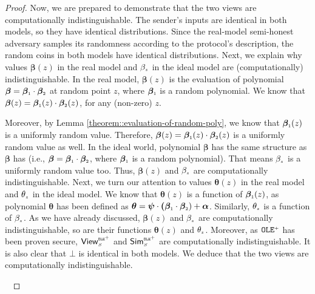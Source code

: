 \begin{proof}
Now, we are prepared to demonstrate that the two views are computationally indistinguishable. The sender's inputs are identical in both models, so they have identical distributions. Since the real-model semi-honest adversary samples its randomness according to the protocol's description, the random coins in both models have identical distributions.  Next, we explain why values $\bm\beta(z)$ in the real model and $\beta_{\scriptscriptstyle z}$ in the ideal model are (computationally) indistinguishable. In the real model, $\bm\beta(z)$ is the evaluation of polynomial $\bm\beta=\bm\beta_{\scriptscriptstyle 1}\cdot \bm\beta_{\scriptscriptstyle 2}$ at random point $z$, where $\bm\beta_{\scriptscriptstyle 1}$ is a random polynomial. We know that $\bm\beta(z)=\bm\beta_{\scriptscriptstyle 1}(z)\cdot \bm\beta_{\scriptscriptstyle 2}(z)$, for any (non-zero) $z$.  

Moreover, by Lemma \ref{theorem::evaluation-of-random-poly}, we know that $\bm\beta_{\scriptscriptstyle 1}(z)$ is a uniformly random value. Therefore, $\bm\beta(z)=\bm\beta_{\scriptscriptstyle 1}(z)\cdot \bm\beta_{\scriptscriptstyle 2}(z)$ is a uniformly random value as well. In the ideal world, polynomial $\bm\beta$ has the same structure as $\bm\beta$ has (i.e., $\bm\beta=\bm\beta_{\scriptscriptstyle 1}\cdot \bm\beta_{\scriptscriptstyle 2}$, where $\bm\beta_{\scriptscriptstyle 1}$ is a random polynomial). That means $\beta_{\scriptscriptstyle z}$ is a uniformly random value too. Thus,  $\bm\beta(z)$ and $\beta_{\scriptscriptstyle z}$ are computationally indistinguishable. Next, we turn our attention to values $\bm\theta(z)$ in the real model and $\theta_{\scriptscriptstyle z}$ in the ideal model. We know that $\bm\theta(z)$ is a function of $\bm\beta_{\scriptscriptstyle 1}(z)$, as polynomial $\bm\theta$ has been defined as $\bm\theta=\bm\psi\cdot \bm(\bm\beta_{\scriptscriptstyle 1}\cdot \bm\beta_{\scriptscriptstyle 2})+\bm\alpha$. Similarly, $\theta_{\scriptscriptstyle z}$ is a function of  $\beta_{\scriptscriptstyle z}$. As we have already discussed,  $\bm\beta(z)$ and $\beta_{\scriptscriptstyle z}$ are computationally indistinguishable, so are their functions $\bm\theta(z)$ and $\theta_{\scriptscriptstyle z}$. Moreover, as  $\mathtt{OLE}^{\scriptscriptstyle +}$ has been proven secure,  $\mathsf{View}^{\scriptscriptstyle \mathtt{OLE}^{\scriptscriptstyle +}}_{\scriptscriptstyle S}$ and  $\mathsf{Sim}^{\scriptscriptstyle \mathtt{OLE}^{\scriptscriptstyle +}}_{\scriptscriptstyle S}$ are computationally indistinguishable. It is also clear that $\bot$ is identical in both models. We deduce that the two views are computationally indistinguishable.


\



\end{proof}
